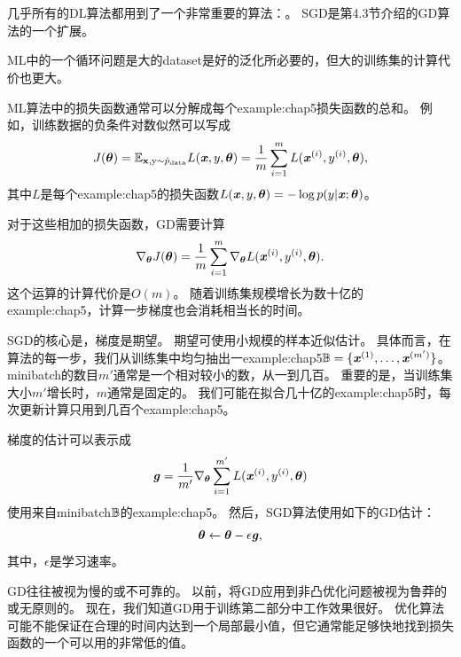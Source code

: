 \section{}
\label{sec:stochastic_gradient_descent_chap5}
几乎所有的\gls{DL}算法都用到了一个非常重要的算法：。
\gls{SGD}是第4.3节介绍的\gls{GD}算法的一个扩展。

\gls{ML}中的一个循环问题是大的\gls{dataset}是好的泛化所必要的，但大的训练集的计算代价也更大。


\gls{ML}算法中的损失函数通常可以分解成每个\gls{example:chap5}损失函数的总和。
例如，训练数据的负条件对数似然可以写成
\begin{equation}
    J(\boldsymbol{\theta}) = \mathbb{E}_{\mathbf{x},\mathrm{y} \sim \hat{p}_{\text{data}}}
    L(\boldsymbol{\mathit{x}}, y, \boldsymbol{\theta}) = 
    \frac{1}{m} \sum_{i=1}^m  L(\boldsymbol{\mathit{x}}^{(i)}, y^{(i)}, \boldsymbol{\theta}) ,
\end{equation}
其中$L$是每个\gls{example:chap5}的损失函数$L(\boldsymbol{\mathit{x}}, y, \boldsymbol{\theta}) = -\log p(y|\boldsymbol{\mathit{x}};\boldsymbol{\theta})$。

对于这些相加的损失函数，\gls{GD}需要计算
\begin{equation}
    \nabla_{\boldsymbol{\theta}} J(\boldsymbol{\theta})
    = \frac{1}{m} \sum_{i=1}^m  
    \nabla_{\boldsymbol{\theta}} L(\boldsymbol{\mathit{x}}^{(i)}, y^{(i)}, \boldsymbol{\theta}) .
\end{equation}
这个运算的计算代价是$O(m)$。
随着训练集规模增长为数十亿的\gls{example:chap5}，计算一步梯度也会消耗相当长的时间。

\gls{SGD}的核心是，梯度是期望。
期望可使用小规模的样本近似估计。
具体而言，在算法的每一步，我们从训练集中均匀抽出一\gls{example:chap5}$\mathbb{B}=\{\boldsymbol{\mathit{x}}^{(1)},\dots,\boldsymbol{\mathit{x}}^{(m')}\}$。
\gls{minibatch}的数目$m'$通常是一个相对较小的数，从一到几百。
重要的是，当训练集大小$m'$增长时，$m$通常是固定的。
我们可能在拟合几十亿的\gls{example:chap5}时，每次更新计算只用到几百个\gls{example:chap5}。

梯度的估计可以表示成
\begin{equation}
    \boldsymbol{\mathit{g}} = \frac{1}{m'} \nabla_{\boldsymbol{\theta}} \sum_{i=1}^{m'}
    L(\boldsymbol{\mathit{x}}^{(i)}, y^{(i)}, \boldsymbol{\theta})
\end{equation}
使用来自\gls{minibatch}$\mathbb{B}$的\gls{example:chap5}。
然后，\gls{SGD}算法使用如下的\gls{GD}估计：
\begin{equation}
    \boldsymbol{\theta} \leftarrow \boldsymbol{\theta} - \epsilon \boldsymbol{\mathit{g}},
\end{equation}
其中，$\epsilon$是学习速率。

\gls{GD}往往被视为慢的或不可靠的。
以前，将\gls{GD}应用到非凸优化问题被视为鲁莽的或无原则的。
现在，我们知道\gls{GD}用于训练第二部分中工作效果很好。
优化算法可能不能保证在合理的时间内达到一个局部最小值，但它通常能足够快地找到损失函数的一个可以用的非常低的值。 

